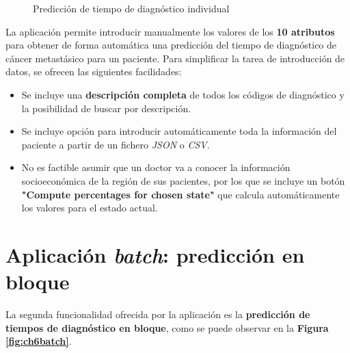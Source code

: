 \begin{figure}[h]
	\vspace{-3mm}
	\centering
	\captionsetup{belowskip=-25pt, justification=centering}
	\caption{Predicción de tiempo de diagnóstico individual}
	\label{fig:ch6single}
\end{figure}

La aplicación permite introducir manualmente los valores de los \textbf{10 atributos} para obtener de forma automática una predicción del tiempo de diagnóstico de cáncer metastásico para un paciente. Para simplificar la tarea de introducción de datos, se ofrecen las siguientes facilidades:

\begin{itemize}[parsep=1pt, itemsep=1pt, topsep=2pt]
	\item Se incluye una \textbf{descripción completa} de todos los códigos de diagnóstico y la posibilidad de buscar por descripción.
	\item Se incluye opción para introducir automáticamente toda la información del paciente a partir de un fichero \textit{JSON} o \textit{CSV}.
	\item No es factible asumir que un doctor va a conocer la información socioeconómica de la región de sus pacientes, por los que se incluye un botón \textbf{"Compute percentages for chosen state"} que calcula automáticamente los valores para el estado actual.
\end{itemize}

\vspace*{-6mm}
\section{Aplicación \textit{batch}: predicción en bloque}

La segunda funcionalidad ofrecida por la aplicación es la \textbf{predicción de tiempos de diagnóstico en bloque}, como se puede observar en la \textbf{Figura \ref{fig:ch6batch}}.

